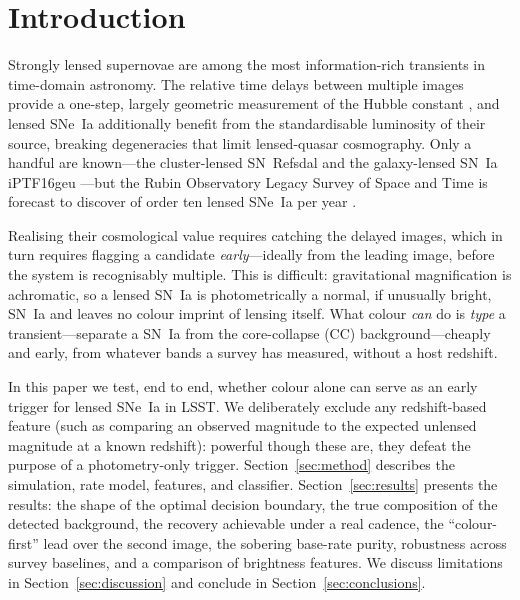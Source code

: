 \documentclass[fleqn,usenatbib]{mnras}
\begin{document}
\section{Introduction}
\label{sec:intro}

Strongly lensed supernovae are among the most information-rich transients in
time-domain astronomy. The relative time delays between multiple images provide
a one-step, largely geometric measurement of the Hubble constant
\citep{Refsdal1964,Suyu2020}, and lensed SNe~Ia additionally benefit from the
standardisable luminosity of their source, breaking degeneracies that limit
lensed-quasar cosmography. Only a handful are known---the cluster-lensed
SN~Refsdal \citep{Kelly2015} and the galaxy-lensed SN~Ia iPTF16geu
\citep{Goobar2017}---but the Rubin Observatory Legacy Survey of Space and Time
\citep[LSST;][]{Ivezic2019} is forecast to discover of order ten lensed SNe~Ia
per year \citep{Oguri2010,Goldstein2019,Wojtak2019}.

Realising their cosmological value requires catching the delayed images, which
in turn requires flagging a candidate \emph{early}---ideally from the leading
image, before the system is recognisably multiple. This is difficult:
gravitational magnification is achromatic, so a lensed SN~Ia is photometrically a
normal, if unusually bright, SN~Ia and leaves no colour imprint of lensing
itself. What colour \emph{can} do is \emph{type} a transient---separate a SN~Ia
from the core-collapse (CC) background---cheaply and early, from whatever bands a
survey has measured, without a host redshift.

In this paper we test, end to end, whether colour alone can serve as an early
trigger for lensed SNe~Ia in LSST. We deliberately exclude any redshift-based
feature (such as comparing an observed magnitude to the expected unlensed
magnitude at a known redshift): powerful though these are, they defeat the
purpose of a photometry-only trigger. Section~\ref{sec:method} describes the
simulation, rate model, features, and classifier. Section~\ref{sec:results}
presents the results: the shape of the optimal decision boundary, the true
composition of the detected background, the recovery achievable under a real
cadence, the ``colour-first'' lead over the second image, the sobering
base-rate purity, robustness across survey baselines, and a comparison of
brightness features. We discuss limitations in Section~\ref{sec:discussion} and
conclude in Section~\ref{sec:conclusions}.
\end{document}
